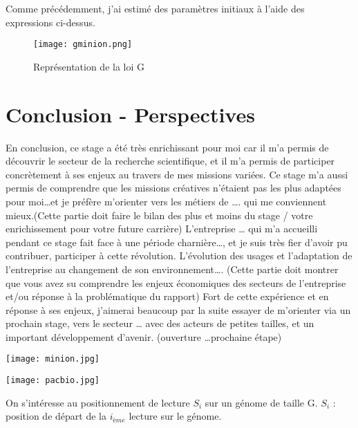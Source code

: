 \documentclass[11pt,a4paper]{article} %
\begin{document}
Comme précédemment, j'ai estimé des paramètres initiaux à l'aide des expressions ci-dessus. 
\begin{figure}[h]
  \centering
  \texttt{[image: gminion.png]}
  \caption{\small Représentation de la loi G}
\end{figure}


\section{Conclusion - Perspectives} 

En conclusion, ce stage a été très enrichissant pour moi car il m’a permis de découvrir le secteur de la recherche scientifique, et il m’a permis de participer concrètement à ses enjeux au travers de mes missions variées. Ce stage m’a aussi permis de comprendre que les missions créatives n’étaient pas les plus adaptées pour moi…et je préfère m’orienter vers les métiers de …. qui me conviennent mieux.(Cette partie doit faire le bilan des plus et moins du stage / votre enrichissement pour votre future carrière)
L’entreprise … qui m’a accueilli pendant ce stage fait face à une période charnière…, et je suis très fier d’avoir pu contribuer, participer à cette révolution. L’évolution des usages et l’adaptation de l’entreprise au changement de son environnement…. 
(Cette partie doit montrer que vous avez su comprendre les enjeux économiques des secteurs de l’entreprise et/ou réponse à la problématique du rapport)
Fort de cette expérience et en réponse à ses enjeux, j’aimerai beaucoup par la suite essayer de m’orienter via un prochain stage, vers le secteur … avec des acteurs de petites tailles, et un important développement d’avenir. 
(ouverture …prochaine étape)
\newpage     
\listoffigures
\newpage
\begin{appendix}    
    \label{a_micro}
    \begin{center}
        \texttt{[image: minion.jpg]}
    \end{center} 
    \label{a_encartage}
    \begin{center}
        \texttt{[image: pacbio.jpg]}
    \end{center}  
\end{appendix}
\newpage

\nocite{*}

On s'intéresse au positionnement de lecture $S_{i}$ sur un génome de taille G. $S_{i}$ : position de départ de la $i_{ème}$ lecture sur le génome.\\
\end{document}
